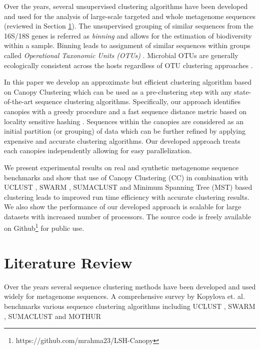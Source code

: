 \documentclass[10pt, conference, compsocconf]{IEEEtran}
\begin{document}
Over the years, several unsupervised clustering algorithms have been developed and used for the analysis of large-scale targeted and whole metagenome sequences (reviewed in Section \ref{sec:Literature}). The unsupervised grouping  of similar sequences from the 16S/18S genes is referred as \emph{binning} and allows for the estimation of biodiversity within a sample. Binning leads to assignment of similar sequences within groups called \emph{Operational Taxonomic Units (OTUs)} \cite{MAROTU}. Microbial OTUs are generally ecologically consistent across the hosts regardless of OTU clustering approaches \cite{MAROTUConsistant}. 


In this paper we develop an approximate but efficient clustering algorithm based on Canopy Clustering \cite{MARCanopy} which can be used as a pre-clustering  step with any state-of-the-art sequence clustering algorithms. Specifically, our approach identifies canopies with a greedy procedure and a fast sequence distance metric based on locality sensitive hashing \cite{MARLshRef2}. Sequences within the canopies are considered as an initial partition (or grouping) of data which can be further refined by applying expensive and accurate clustering algorithms. Our developed approach treats each canopies independently allowing for easy parallelization.

We present experimental results on real and synthetic metagenome sequence benchmarks and show that use of Canopy Clustering (CC) in combination with UCLUST \cite{MARuclust}, SWARM \cite{MARSwarm2}, SUMACLUST \cite{MARSumaclust} and Minimum Spanning Tree (MST) based clustering leads to improved run time efficiency with accurate clustering results. We also show the performance of our developed approach is scalable for large datasets with increased number of processors. The source code is freely available on Github\footnote{https://github.com/mrahma23/LSH-Canopy} for public use. 
          

\section{Literature Review}
\label{sec:Literature}

Over the years several sequence clustering methods have been developed and used widely for metagenome sequences. A comprehensive survey by Kopylova et. al. \cite{MARopenDeNovo} benchmarks various sequence clustering algorithms  including UCLUST \cite{MARuclust}, SWARM \cite{MARSwarm2}, SUMACLUST \cite{MARSumaclust} and MOTHUR \cite{MARMothur}
\end{document}
